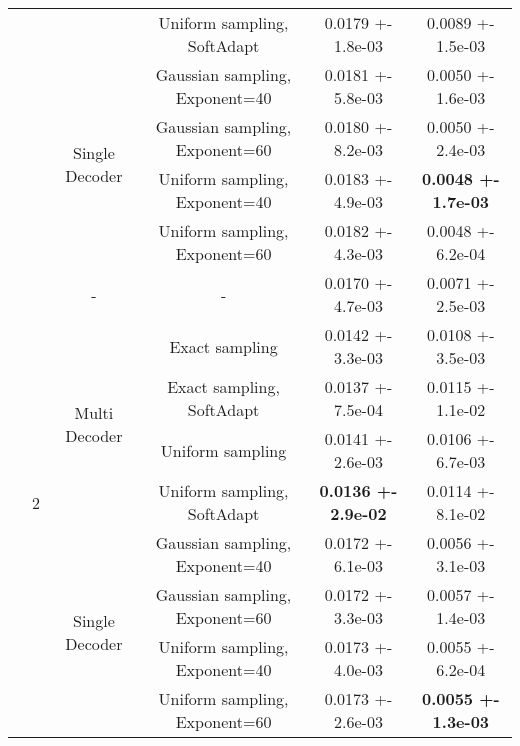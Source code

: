 \begin{tabular}{||c|c|c|c|c|c||}
\cline{4-6}
 &  &  & Uniform sampling, SoftAdapt & 0.0179 +- 1.8e-03 & 0.0089 +- 1.5e-03 \\
\cline{4-6}
\cline{3-6}
 &  & \multirow{4}{*}{Single Decoder} & Gaussian sampling, Exponent=40 & 0.0181 +- 5.8e-03 & 0.0050 +- 1.6e-03 \\
\cline{4-6}
 &  &  & Gaussian sampling, Exponent=60 & 0.0180 +- 8.2e-03 & 0.0050 +- 2.4e-03 \\
\cline{4-6}
 &  &  & Uniform sampling, Exponent=40 & 0.0183 +- 4.9e-03 & \textbf{0.0048 +- 1.7e-03} \\
\cline{4-6}
 &  &  & Uniform sampling, Exponent=60 & 0.0182 +- 4.3e-03 & 0.0048 +- 6.2e-04 \\
\cline{4-6}
\cline{3-6}
\cline{2-6}
 & \multirow{9}{*}{2} & \multirow{1}{*}{-} & - & 0.0170 +- 4.7e-03 & 0.0071 +- 2.5e-03 \\
\cline{4-6}
\cline{3-6}
 &  & \multirow{4}{*}{Multi Decoder} & Exact sampling & 0.0142 +- 3.3e-03 & 0.0108 +- 3.5e-03 \\
\cline{4-6}
 &  &  & Exact sampling, SoftAdapt & 0.0137 +- 7.5e-04 & 0.0115 +- 1.1e-02 \\
\cline{4-6}
 &  &  & Uniform sampling & 0.0141 +- 2.6e-03 & 0.0106 +- 6.7e-03 \\
\cline{4-6}
 &  &  & Uniform sampling, SoftAdapt & \textbf{0.0136 +- 2.9e-02} & 0.0114 +- 8.1e-02 \\
\cline{4-6}
\cline{3-6}
 &  & \multirow{4}{*}{Single Decoder} & Gaussian sampling, Exponent=40 & 0.0172 +- 6.1e-03 & 0.0056 +- 3.1e-03 \\
\cline{4-6}
 &  &  & Gaussian sampling, Exponent=60 & 0.0172 +- 3.3e-03 & 0.0057 +- 1.4e-03 \\
\cline{4-6}
 &  &  & Uniform sampling, Exponent=40 & 0.0173 +- 4.0e-03 & 0.0055 +- 6.2e-04 \\
\cline{4-6}
 &  &  & Uniform sampling, Exponent=60 & 0.0173 +- 2.6e-03 & \textbf{0.0055 +- 1.3e-03} \\
\cline{4-6}
\cline{3-6}
\cline{2-6}
\hline
\hline
\end{tabular}
